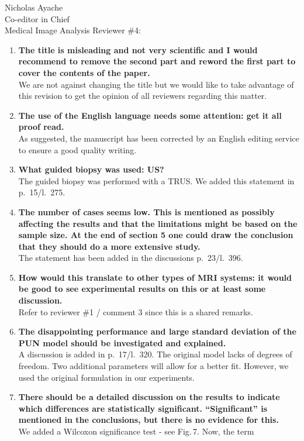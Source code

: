 \documentclass{letter}
\begin{document}
\begin{letter}{Nicholas Ayache \\ Co-editor in Chief \\ Medical Image Analysis}
  Reviewer \#4:
  \begin{enumerate}
  \item \textbf{The title is misleading and not very scientific and I
      would recommend to remove the second part and reword the first
      part to cover the contents of the paper.}\\
    We are not against changing the title but we would like to take
    advantage of this revision to get the opinion of all reviewers
    regarding this matter.
  \item \textbf{The use of the English language needs some attention:
      get it all proof read.}\\
    As suggested, the manuscript has been corrected by an English editing
    service to ensure a good quality writing.
  \item \textbf{What guided biopsy was used: US?}\\
    The guided biopsy was performed with a TRUS. We added this
    statement in p.~15/l.~275.
  \item \textbf{The number of cases seems low. This is mentioned as
      possibly affecting the results and that the limitations might be
      based on the sample size. At the end of section 5 one could draw
      the conclusion that they should do a more extensive study.}\\
    The statement has been added in the discussions p.~23/l.~396.
  \item \textbf{How would this translate to other types of MRI
      systems: it would be good to see experimental results on this or
      at least some discussion.}\\
    Refer to reviewer \#1 / comment 3 since this is a shared remarks.
  \item \textbf{The disappointing performance and large standard
      deviation of the PUN model should be investigated and
      explained.}\\
    A discussion is added in p.~17/l.~320. The original model lacks of
    degrees of freedom. Two additional parameters will
    allow for a better fit. However, we used the original formulation
    in our experiments.
  \item \textbf{There should be a detailed discussion on the results
      to indicate which differences are statistically
      significant. ``Significant'' is mentioned in the conclusions, but
      there is no evidence for this.}\\
    We added a Wilcoxon significance test - see Fig.\,7. Now, the term

\end{enumerate}
\end{letter}
\end{document}
